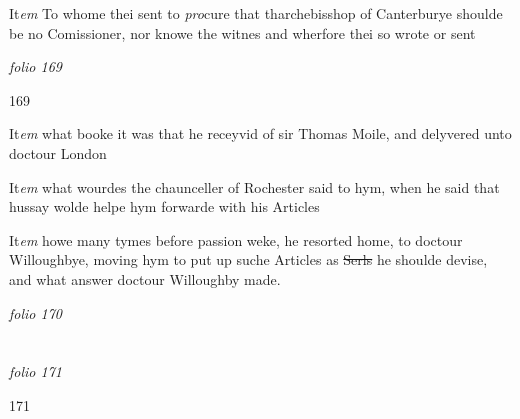 \documentclass[12pt, a4paper]{book}
\begin{document}
		\ifthenelse{\isodd{\thepage}}
		{\reversemarginpar}
		{\normalmarginpar}
		It\textit{em} To whome thei sent to \textit{pro}cure that tharchebisshop of Canterburye shoulde be no Comissioner, nor knowe the witnes and wherfore thei so wrote or sent

\dotfill
					

\textit{folio 169}


 	\begin{flushright}{\color{Mahogany}169}\end{flushright}
 	
		\ifthenelse{\isodd{\thepage}}
		{\reversemarginpar}
		{\normalmarginpar}
		It\textit{em} what booke it was that he receyvid of sir Thomas Moile, and  delyvered unto doctour London
 	
		\ifthenelse{\isodd{\thepage}}
		{\reversemarginpar}
		{\normalmarginpar}
		It\textit{em} what wourdes the chaunceller of Rochester said to hym, when he said that hussay wolde helpe hym forwarde with his Articles
 	
		\ifthenelse{\isodd{\thepage}}
		{\reversemarginpar}
		{\normalmarginpar}
		It\textit{em} howe many tymes before passion weke, he resorted home, to doctour Willoughbye, moving hym to put up suche Articles as \sout{Serls }
               he 
			shoulde devise, and what answer doctour Willoughby made.

\dotfill
					

\textit{folio 170}


         \vspace{4cm}
         
\dotfill
					  \section*{}  \subsection*{}

\textit{folio 171}



            		\begin{flushright}{\color{Mahogany}171}\end{flushright}
            		
\end{document}
